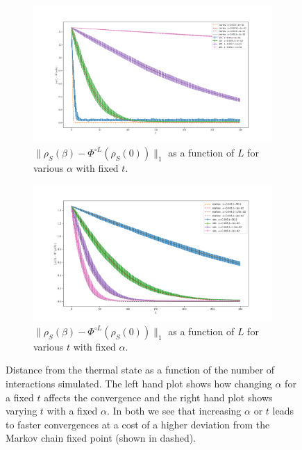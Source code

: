 \documentclass{article}
\newcommand{\norm}[1]{\| #1 \|}
\begin{document}
\begin{figure}
    \centering
    \begin{subfigure}{0.75\textwidth}
        \includegraphics[width=\textwidth]{numerics/data/sho_error_vs_l_fix_alpha.png}     
        \caption{$\norm{\rho_S(\beta) - \Phi^{\circ L }(\rho_S(0))}_1$ as a function of $L$ for various $\alpha$ with fixed $t$.}
    \end{subfigure}
    \begin{subfigure}{0.75\textwidth}
        \includegraphics[width=\textwidth]{numerics/data/sho_error_vs_l_fix_time.png}    
        \caption{$\norm{\rho_S(\beta) - \Phi^{\circ L }(\rho_S(0))}_1$ as a function of $L$ for various $t$ with fixed $\alpha$.}
    \end{subfigure}
    
    \caption{Distance from the thermal state as a function of the number of interactions simulated. The left hand plot shows how changing $\alpha$ for a fixed $t$ affects the convergence and the right hand plot shows varying $t$ with a fixed $\alpha$. In both we see that increasing $\alpha$ or $t$ leads to faster convergences at a cost of a higher deviation from the Markov chain fixed point (shown in dashed). }
    \label{fig:sho_error_vs_interactions}
\end{figure}
\end{document}
